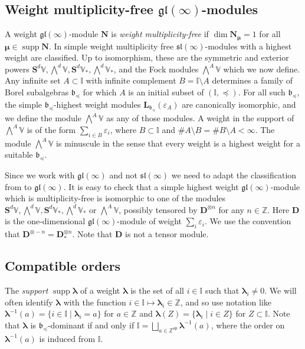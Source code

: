 \documentclass[11pt,fleqn]{amsart}
\newcommand\ZZ{\mathbb Z}
\newcommand\II{\mathbb I}
\renewcommand\epsilon{\varepsilon}
\theoremstyle{definition}
\theoremstyle{remark}
\theoremstyle{remark}
\newcommand\VV{\mathbb V}
\newcommand\gl{\mathfrak{gl}}
\renewcommand\sl{\mathfrak{sl}}
\renewcommand\SS{\mathbf S}
\newcommand\lie[1]{\mathfrak{#1}}
\newcommand\op{\mathsf{op}}
\newcommand\wt[1]{\boldsymbol{#1}}
\DeclareMathOperator\supp{supp}
\begin{document}
\subsection{Weight multiplicity-free $\gl(\infty)$-modules}
A weight $\gl(\infty)$-module $\mathbf N$ is \emph{weight multiplicity-free} if
$\dim \mathbf N_{\wt\mu} = 1$ for all $\wt\mu \in \supp \mathbf N$. In 
\cite{GP20} simple weight multiplicity free $\sl(\infty)$-modules with a 
highest weight are classified. Up to isomorphism, these are the symmetric and 
exterior powers $\SS^d\VV, \bigwedge^d \VV, \SS^d\VV_*, \bigwedge^d \VV_*$, 
and the Fock modules $\bigwedge^A \VV$ which we now define. Any infinite set 
$A \subset \II$ with infinite complement $B = \II \setminus A$ determines a 
family of Borel subalgebras $\lie b_{\preceq}$ for which $A$ is an initial 
subset of $(\II, \preceq)$. For all such $\lie b_{\preceq}$, the simple $\lie 
b_{\preceq}$-highest weight modules $\mathbf L_{\lie b_{\preceq}}(\epsilon_A)$
are canonically isomorphic, and we define the module $\bigwedge^A \VV$ as any 
of those modules.
A weight in the support of $\bigwedge^A \VV$ is of the form $\sum_{i \in B} 
\epsilon_i$, where $B \subset \II$ and $\# A \setminus B = \# B \setminus A < 
\infty$. The module $\bigwedge^A \VV$ is minuscule in the sense that every 
weight is a highest weight for a suitable $\lie b_{\preceq}$.

Since we work with $\gl(\infty)$ and not $\sl(\infty)$ we need to adapt the 
classification from \cite{GP20} to $\gl(\infty)$. It is easy to check that a 
simple highest weight $\gl(\infty)$-module which is multiplicity-free is 
isomorphic to one of the modules $\SS^d\VV, \bigwedge^d \VV, \SS^d\VV_*, 
\bigwedge^d \VV_*$ or $\bigwedge^A \VV$, possibly tensored by $\mathbf 
D^{\otimes n}$ for any $n \in \ZZ$. Here $\mathbf D$ is the one-dimensional 
$\gl(\infty)$-module of weight $\sum_i \epsilon_i$. We use the convention that 
$\mathbf D^{\otimes - n} = \mathbf D_*^{\otimes n}$. Note that $\mathbf D$ is 
not a tensor module.

\subsection{Compatible orders}
The \emph{support} $\supp \wt\lambda$ of a weight $\wt\lambda$ is the set of all 
$i \in \II$ such that $\wt\lambda_i \neq 0$. 
We will often identify $\wt\lambda$ with the function $i \in \II \mapsto 
\wt\lambda_i \in \ZZ$, and so use notation like $\wt\lambda^{-1}(a) = \{i \in \II 
\mid \wt\lambda_i = a\}$ for $a \in \ZZ$ and $\wt\lambda(Z) = \{\wt\lambda_i \mid 
i \in Z\}$ for $Z \subset \II$. Note that $\wt\lambda$ is $\lie 
b_{\preceq}$-dominant if and only if $\II = \bigsqcup_{a \in \ZZ^\op} 
\wt\lambda^{-1}(a)$, where the order on $\wt\lambda^{-1}(a)$ is induced from 
$\II$. 
\end{document}
